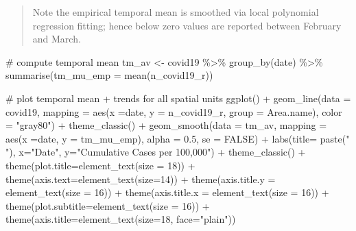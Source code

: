 \documentclass[
  letterpaper,
  krantz2]{style/krantz}
\newenvironment{Shaded}{\begin{snugshade}}{\end{snugshade}}
\newcommand{\AttributeTok}[1]{\textcolor[rgb]{0.40,0.45,0.13}{#1}}
\newcommand{\CommentTok}[1]{\textcolor[rgb]{0.37,0.37,0.37}{#1}}
\newcommand{\ConstantTok}[1]{\textcolor[rgb]{0.56,0.35,0.01}{#1}}
\newcommand{\DecValTok}[1]{\textcolor[rgb]{0.68,0.00,0.00}{#1}}
\newcommand{\FloatTok}[1]{\textcolor[rgb]{0.68,0.00,0.00}{#1}}
\newcommand{\FunctionTok}[1]{\textcolor[rgb]{0.28,0.35,0.67}{#1}}
\newcommand{\NormalTok}[1]{\textcolor[rgb]{0.00,0.23,0.31}{#1}}
\newcommand{\OtherTok}[1]{\textcolor[rgb]{0.00,0.23,0.31}{#1}}
\newcommand{\SpecialCharTok}[1]{\textcolor[rgb]{0.37,0.37,0.37}{#1}}
\newcommand{\StringTok}[1]{\textcolor[rgb]{0.13,0.47,0.30}{#1}}
\begin{document}
\begin{quote}
Note the empirical temporal mean is smoothed via local polynomial
regression fitting; hence below zero values are reported between
February and March.
\end{quote}

\begin{Shaded}
\begin{Highlighting}[]
\CommentTok{\# compute temporal mean}
\NormalTok{tm\_av }\OtherTok{\textless{}{-}}\NormalTok{ covid19 }\SpecialCharTok{\%\textgreater{}\%} \FunctionTok{group\_by}\NormalTok{(date) }\SpecialCharTok{\%\textgreater{}\%}
  \FunctionTok{summarise}\NormalTok{(}\AttributeTok{tm\_mu\_emp =} \FunctionTok{mean}\NormalTok{(n\_covid19\_r))}

\CommentTok{\# plot temporal mean + trends for all spatial units}
\FunctionTok{ggplot}\NormalTok{() }\SpecialCharTok{+}
  \FunctionTok{geom\_line}\NormalTok{(}\AttributeTok{data =}\NormalTok{ covid19, }\AttributeTok{mapping =} \FunctionTok{aes}\NormalTok{(}\AttributeTok{x =}\NormalTok{date, }\AttributeTok{y =}\NormalTok{ n\_covid19\_r,}
                          \AttributeTok{group =}\NormalTok{ Area.name), }\AttributeTok{color =} \StringTok{"gray80"}\NormalTok{) }\SpecialCharTok{+}
   \FunctionTok{theme\_classic}\NormalTok{() }\SpecialCharTok{+}
  \FunctionTok{geom\_smooth}\NormalTok{(}\AttributeTok{data =}\NormalTok{ tm\_av, }\AttributeTok{mapping =} \FunctionTok{aes}\NormalTok{(}\AttributeTok{x =}\NormalTok{date, }\AttributeTok{y =}\NormalTok{ tm\_mu\_emp), }
              \AttributeTok{alpha =} \FloatTok{0.5}\NormalTok{,}
              \AttributeTok{se =} \ConstantTok{FALSE}\NormalTok{) }\SpecialCharTok{+}
    \FunctionTok{labs}\NormalTok{(}\AttributeTok{title=} \FunctionTok{paste}\NormalTok{(}\StringTok{" "}\NormalTok{), }\AttributeTok{x=}\StringTok{"Date"}\NormalTok{, }\AttributeTok{y=}\StringTok{"Cumulative Cases per 100,000"}\NormalTok{) }\SpecialCharTok{+}
    \FunctionTok{theme\_classic}\NormalTok{() }\SpecialCharTok{+}
    \FunctionTok{theme}\NormalTok{(}\AttributeTok{plot.title=}\FunctionTok{element\_text}\NormalTok{(}\AttributeTok{size =} \DecValTok{18}\NormalTok{)) }\SpecialCharTok{+}
    \FunctionTok{theme}\NormalTok{(}\AttributeTok{axis.text=}\FunctionTok{element\_text}\NormalTok{(}\AttributeTok{size=}\DecValTok{14}\NormalTok{)) }\SpecialCharTok{+}
    \FunctionTok{theme}\NormalTok{(}\AttributeTok{axis.title.y =} \FunctionTok{element\_text}\NormalTok{(}\AttributeTok{size =} \DecValTok{16}\NormalTok{)) }\SpecialCharTok{+}
    \FunctionTok{theme}\NormalTok{(}\AttributeTok{axis.title.x =} \FunctionTok{element\_text}\NormalTok{(}\AttributeTok{size =} \DecValTok{16}\NormalTok{)) }\SpecialCharTok{+}
    \FunctionTok{theme}\NormalTok{(}\AttributeTok{plot.subtitle=}\FunctionTok{element\_text}\NormalTok{(}\AttributeTok{size =} \DecValTok{16}\NormalTok{)) }\SpecialCharTok{+}
    \FunctionTok{theme}\NormalTok{(}\AttributeTok{axis.title=}\FunctionTok{element\_text}\NormalTok{(}\AttributeTok{size=}\DecValTok{18}\NormalTok{, }\AttributeTok{face=}\StringTok{"plain"}\NormalTok{))}
\end{Highlighting}
\end{Shaded}
\end{document}
